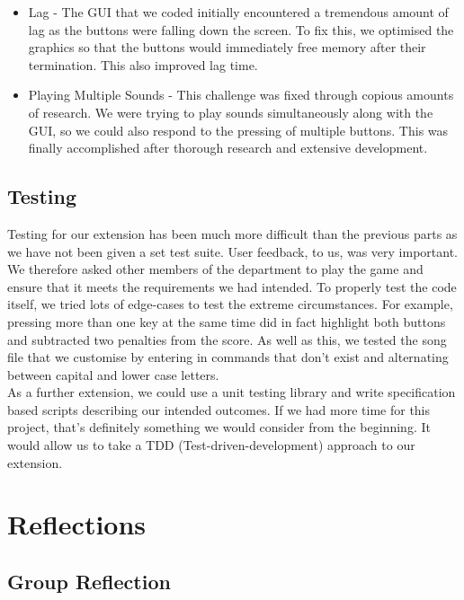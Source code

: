 \documentclass[11pt]{article}
\begin{document}
\begin{itemize}

\item Lag - The GUI that we coded initially encountered a tremendous amount of lag as the buttons were falling down the screen. To fix this, we optimised the graphics so that the buttons would immediately free memory after their termination. This also improved lag time.

\item Playing Multiple Sounds - This challenge was fixed through copious amounts of research. We were trying to play sounds simultaneously along with the GUI, so we could also respond to the pressing of multiple buttons. This was finally accomplished after thorough research and extensive development.

\end{itemize}

\subsection{Testing}

Testing for our extension has been much more difficult than the previous parts as we have not been given a set test suite. User feedback, to us, was very important. We therefore asked other members of the department to play the game and ensure that it meets the requirements we had intended. To properly test the code itself, we tried lots of edge-cases to test the extreme circumstances. For example, pressing more than one key at the same time did in fact highlight both buttons and subtracted two penalties from the score. As well as this, we tested the song file that we customise by entering in commands that don't exist and alternating between capital and lower case letters.
\\
As a further extension, we could use a unit testing library and write specification based scripts describing our intended outcomes. If we had more time for this project, that's definitely something we would consider from the beginning. It would allow us to take a TDD (Test-driven-development) approach to our extension.


\section{Reflections}

\subsection{Group Reflection}
\end{document}
